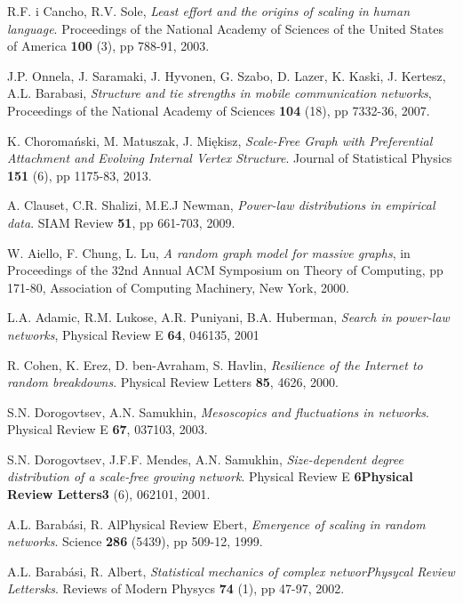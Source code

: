 \begin{thebibliography}{99}
  R.F. i Cancho, R.V. Sole,
  \emph{Least effort and the origins of scaling in human language}.
  Proceedings of the National Academy of Sciences of the United States of America \textbf{100} (3), pp 788-91,
  2003.

  J.P. Onnela, J. Saramaki, J. Hyvonen, G. Szabo, D. Lazer, K. Kaski, J. Kertesz, A.L. Barabasi,
  \emph{Structure and tie strengths in mobile communication networks},
  Proceedings of the National Academy of Sciences \textbf{104} (18), pp 7332-36,
  2007.

  K. Choromański, M. Matuszak, J. Miękisz,
  \emph{Scale-Free Graph with Preferential Attachment and Evolving Internal Vertex Structure}.
  Journal of Statistical Physics \textbf{151} (6), pp 1175-83,
  2013.

  A. Clauset, C.R. Shalizi, M.E.J Newman,
  \emph{Power-law distributions in empirical data}.
  SIAM Review \textbf{51}, pp 661-703,
  2009.

  W. Aiello, F. Chung, L. Lu,
  \emph{A random graph model for massive graphs},
  in Proceedings of the 32nd Annual ACM Symposium on Theory of Computing, pp 171-80,
  Association of Computing Machinery, New York,
  2000.

  L.A. Adamic, R.M. Lukose, A.R. Puniyani, B.A. Huberman,
  \emph{Search in power-law networks},
  Physical Review E \textbf{64}, 046135,
  2001

  R. Cohen, K. Erez, D. ben-Avraham, S. Havlin,
  \emph{Resilience of the Internet to random breakdowns}.
  Physical Review Letters \textbf{85}, 4626,
  2000.

  S.N. Dorogovtsev, A.N. Samukhin,
  \emph{Mesoscopics and fluctuations in networks}.
  Physical Review E \textbf{67}, 037103,
  2003.

  S.N. Dorogovtsev, J.F.F. Mendes, A.N. Samukhin,
  \emph{Size-dependent degree distribution of a scale-free growing network}.
  Physical Review E \textbf{6Physical Review Letters3} (6), 062101,
  2001.

  A.L. Barabási, R. AlPhysical Review Ebert,
  \emph{Emergence of scaling in random networks}.
  Science \textbf{286} (5439), pp 509-12,
  1999.

  A.L. Barabási, R. Albert,
  \emph{Statistical mechanics of complex networPhysycal Review Lettersks}.
  Reviews of Modern Physycs \textbf{74} (1), pp 47-97,
  2002.
  

\end{thebibliography}
